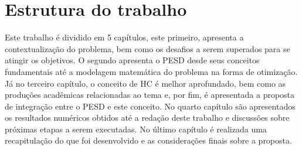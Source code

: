 \section{Estrutura do trabalho}

Este trabalho é dividido em 5 capítulos, este primeiro, apresenta a contextualização do problema, bem como os desafios a serem superados para se atingir os objetivos. O segundo apresenta o \ac{PESD} desde seus conceitos fundamentais até a modelagem matemática do problema na forma de otimização. Já no terceiro capítulo, o conceito de \ac{HC} é melhor aprofundado, bem como as produções acadêmicas relacionadas ao tema e, por fim, é apresentada a proposta de integração entre o \ac{PESD} e este conceito. No quarto capítulo são apresentados os resultados numéricos obtidos até a redação deste trabalho e discussões sobre próximas etapas a serem executadas. No último capítulo é realizada uma recapitulação do que foi desenvolvido e as considerações finais sobre a proposta.